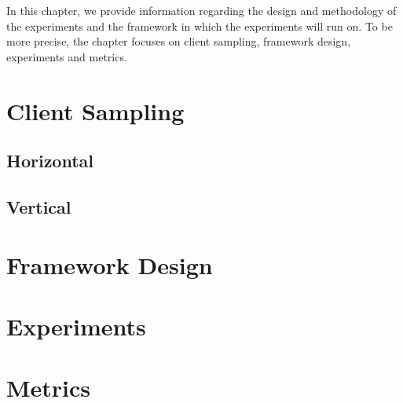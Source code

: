 In this chapter, we provide information regarding the design and methodology of the experiments and the framework in which the experiments will run on. To be more precise, the chapter focuses on client sampling, framework design, experiments and metrics.

\section{Client Sampling}

\todo{}

\subsection{Horizontal}

\todo{}

\subsection{Vertical}


\section{Framework Design}


\section{Experiments}

\todo{}

\section{Metrics}

\todo{}
